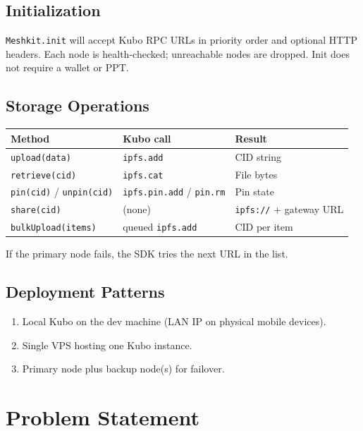 \documentclass[11pt,a4paper,openany]{report}
\begin{document}
\section{Initialization}

\texttt{Meshkit.init} will accept Kubo RPC URLs in priority order and optional HTTP headers. Each node is health-checked; unreachable nodes are dropped. Init does not require a wallet or PPT.

\section{Storage Operations}

\begin{center}
\begin{tabular}{@{}llp{6.2cm}@{}}
\toprule
\textbf{Method} & \textbf{Kubo call} & \textbf{Result} \\
\midrule
\texttt{upload(data)} & \texttt{ipfs.add} & CID string \\
\texttt{retrieve(cid)} & \texttt{ipfs.cat} & File bytes \\
\texttt{pin(cid)} / \texttt{unpin(cid)} & \texttt{ipfs.pin.add} / \texttt{pin.rm} & Pin state \\
\texttt{share(cid)} & (none) & \texttt{ipfs://} + gateway URL \\
\texttt{bulkUpload(items)} & queued \texttt{ipfs.add} & CID per item \\
\bottomrule
\end{tabular}
\end{center}

If the primary node fails, the SDK tries the next URL in the list.

\section{Deployment Patterns}

\begin{enumerate}[leftmargin=*]
  \item Local Kubo on the dev machine (LAN IP on physical mobile devices).
  \item Single VPS hosting one Kubo instance.
  \item Primary node plus backup node(s) for failover.
\end{enumerate}

\chapter{Problem Statement}
\end{document}
